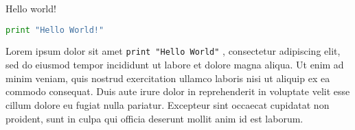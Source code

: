 \documentclass[a4paper]{article}
\begin{document}
Hello world!

\begin{lstlisting}[language=Python]
print "Hello World!"
\end{lstlisting}



Lorem ipsum dolor sit amet \lstinline{print "Hello World"} , consectetur adipiscing elit, sed do eiusmod tempor incididunt ut labore et dolore magna aliqua. Ut enim ad minim veniam, quis nostrud exercitation ullamco laboris nisi ut aliquip ex ea commodo consequat. Duis aute irure dolor in reprehenderit in voluptate velit esse cillum dolore eu fugiat nulla pariatur. Excepteur sint occaecat cupidatat non proident, sunt in culpa qui officia deserunt mollit anim id est laborum.
\end{document}
